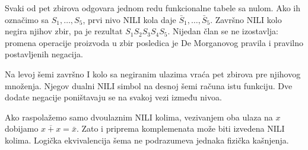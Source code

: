 Svaki od pet zbirova odgovara jednom redu funkcionalne tabele sa nulom. Ako ih označimo sa \(S_1,\ldots,S_5\), prvi nivo NILI kola daje \(\bar S_1,\ldots,\bar S_5\). Završno NILI kolo negira njihov zbir, pa je rezultat \(S_1S_2S_3S_4S_5\). Nijedan član se ne izostavlja: promena operacije proizvoda u zbir posledica je De Morganovog pravila i pravilno postavljenih negacija.

Na levoj šemi završno I kolo sa negiranim ulazima vraća pet zbirova pre njihovog množenja. Njegov dualni NILI simbol na desnoj šemi računa istu funkciju. Dve dodate negacije poništavaju se na svakoj vezi između nivoa.

Ako raspolažemo samo dvoulaznim NILI kolima, vezivanjem oba ulaza na \(x\) dobijamo \(\overline{x+x}=\bar x\). Zato i priprema komplemenata može biti izvedena NILI kolima. Logička ekvivalencija šema ne podrazumeva jednaka fizička kašnjenja.
